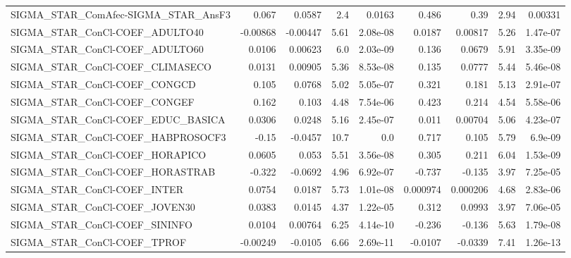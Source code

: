 \begin{tabular}{lrrrrrrrr}
SIGMA\_STAR\_ComAfec-SIGMA\_STAR\_AnsF3 &       0.067 &       0.0587 &     2.4 &   0.0163 &      0.486 &        0.39 &         2.94 &       0.00331 \\
SIGMA\_STAR\_ConCl-COEF\_ADULTO40      &    -0.00868 &     -0.00447 &    5.61 & 2.08e-08 &     0.0187 &     0.00817 &         5.26 &      1.47e-07 \\
SIGMA\_STAR\_ConCl-COEF\_ADULTO60      &      0.0106 &      0.00623 &     6.0 & 2.03e-09 &      0.136 &      0.0679 &         5.91 &      3.35e-09 \\
SIGMA\_STAR\_ConCl-COEF\_CLIMASECO     &      0.0131 &      0.00905 &    5.36 & 8.53e-08 &      0.135 &      0.0777 &         5.44 &      5.46e-08 \\
SIGMA\_STAR\_ConCl-COEF\_CONGCD        &       0.105 &       0.0768 &    5.02 & 5.05e-07 &      0.321 &       0.181 &         5.13 &      2.91e-07 \\
SIGMA\_STAR\_ConCl-COEF\_CONGEF        &       0.162 &        0.103 &    4.48 & 7.54e-06 &      0.423 &       0.214 &         4.54 &      5.58e-06 \\
SIGMA\_STAR\_ConCl-COEF\_EDUC\_BASICA   &      0.0306 &       0.0248 &    5.16 & 2.45e-07 &      0.011 &     0.00704 &         5.06 &      4.23e-07 \\
SIGMA\_STAR\_ConCl-COEF\_HABPROSOCF3   &       -0.15 &      -0.0457 &    10.7 &      0.0 &      0.717 &       0.105 &         5.79 &       6.9e-09 \\
SIGMA\_STAR\_ConCl-COEF\_HORAPICO      &      0.0605 &        0.053 &    5.51 & 3.56e-08 &      0.305 &       0.211 &         6.04 &      1.53e-09 \\
SIGMA\_STAR\_ConCl-COEF\_HORASTRAB     &      -0.322 &      -0.0692 &    4.96 & 6.92e-07 &     -0.737 &      -0.135 &         3.97 &      7.25e-05 \\
SIGMA\_STAR\_ConCl-COEF\_INTER         &      0.0754 &       0.0187 &    5.73 & 1.01e-08 &   0.000974 &    0.000206 &         4.68 &      2.83e-06 \\
SIGMA\_STAR\_ConCl-COEF\_JOVEN30       &      0.0383 &       0.0145 &    4.37 & 1.22e-05 &      0.312 &      0.0993 &         3.97 &      7.06e-05 \\
SIGMA\_STAR\_ConCl-COEF\_SININFO       &      0.0104 &      0.00764 &    6.25 & 4.14e-10 &     -0.236 &      -0.136 &         5.63 &      1.79e-08 \\
SIGMA\_STAR\_ConCl-COEF\_TPROF         &    -0.00249 &      -0.0105 &    6.66 & 2.69e-11 &    -0.0107 &     -0.0339 &         7.41 &      1.26e-13 \\

\end{tabular}
